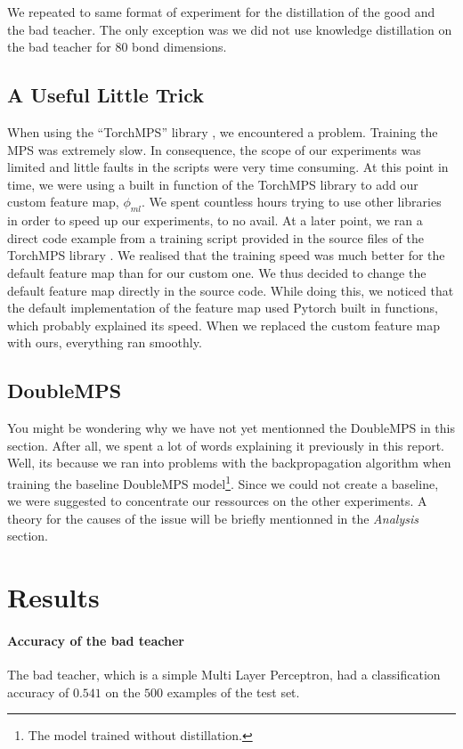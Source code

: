 \documentclass{article}
\theoremstyle{definition}
\theoremstyle{definition}
\begin{document}
We repeated to same format of experiment for the distillation of the good and the bad teacher. The only exception was we did not use knowledge distillation on the bad teacher for $80$ bond dimensions.

\subsection{A Useful Little Trick}
When using the \enquote{TorchMPS} library \cite{torchmps}, we encountered a problem. Training the MPS was extremely slow. In consequence, the scope of our experiments was limited and little faults in the scripts were very time consuming. At this point in time, we were using a built in function of the TorchMPS library to add our custom feature map, $\phi_{ml}$. We spent countless hours trying to use other libraries in order to speed up our experiments, to no avail. At a later point, we ran a direct code example from a training script provided in the source files of the TorchMPS library \cite{torchmps}. We realised that the training speed was much better for the default feature map than for our custom one. We thus decided to change the default feature map directly in the source code. While doing this, we noticed that the default implementation of the feature map used Pytorch built in functions, which probably explained its speed. When we replaced the custom feature map with ours, everything ran smoothly.


\subsection{DoubleMPS}
You might be wondering why we have not yet mentionned the DoubleMPS in this section. After all, we spent a lot of words explaining it previously in this report. Well, its because we ran into problems with the backpropagation algorithm when training the baseline DoubleMPS model\footnote{The model trained without distillation.}. Since we could not create a baseline, we were suggested to concentrate our ressources on the other experiments. A theory for the causes of the issue will be briefly mentionned in the \emph{Analysis} section. 


\section{Results}
\paragraph{Accuracy of the bad teacher}
The bad teacher, which is a simple Multi Layer Perceptron, had a classification accuracy of $0.541$ on the $500$ examples of the test set.
\end{document}
